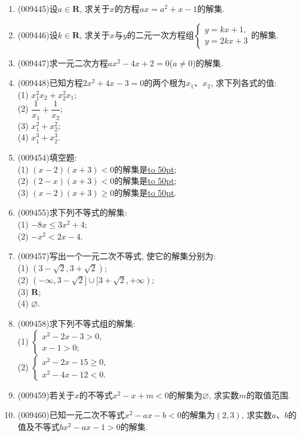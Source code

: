 \documentclass[10pt,a4paper]{article}
\newcommand{\blank}[1]{\underline{\hbox to #1pt{}}}
\begin{document}
\begin{enumerate}[1.]
\item {\tiny (009445)}设$a\in \mathbf{R}$, 求关于$x$的方程$ax=a^2+x-1$的解集.
\item {\tiny (009446)}设$k\in \mathbf{R}$, 求关于$x$与$y$的二元一次方程组$\begin{cases}y=kx+1, \\ y=2kx+3 \end{cases}$的解集.
\item {\tiny (009447)}求一元二次方程$ax^2-4x+2=0$($a\ne 0$)的解集.
\item {\tiny (009448)}已知方程$2x^2+4x-3=0$的两个根为$x_1$、$x_2$, 求下列各式的值:\\
(1) $x_1^2x_2+x_2^2x_1$;\\
(2) $\dfrac1{x_1}+\dfrac1{x_2}$;\\
(3) $x_1^2+x_2^2$;\\
(4) $x_1^3+x_2^3$.
\item {\tiny (009454)}填空题:\\
(1) $(x-2)(x+3)<0$的解集是\blank{50};\\
(2) $(2-x)(x+3)<0$的解集是\blank{50};\\
(3) $(x-2)(x+3)\ge 0$的解集是\blank{50}.
\item {\tiny (009455)}求下列不等式的解集:\\
(1) $-8x\le 3x^2+4$;\\
(2) $-x^2<2x-4$.
\item {\tiny (009457)}写出一个一元二次不等式, 使它的解集分别为:\\
(1) $(3-\sqrt 2, 3+\sqrt 2)$;\\
(2) $(-\infty, 3-\sqrt 2]\cup [3+\sqrt 2, +\infty)$;\\
(3) $\mathbf{R}$;\\
(4) $\varnothing$.
\item {\tiny (009458)}求下列不等式组的解集:\\
(1) $\begin{cases} x^2-2x-3>0, \\ x-1>0; \end{cases}$\\
(2) $\begin{cases} x^2-2x-15\ge 0, \\ x^2-4x-12<0. \end{cases}$\\
\item {\tiny (009459)}若关于$x$的不等式$x^2-x+m<0$的解集为$\varnothing$, 求实数$m$的取值范围.
\item {\tiny (009460)}已知一元二次不等式$x^2-ax-b<0$的解集为$(2, 3)$, 求实数$a$、$b$的值及不等式$bx^2-ax-1>0$的解集.

\end{enumerate}
\end{document}
